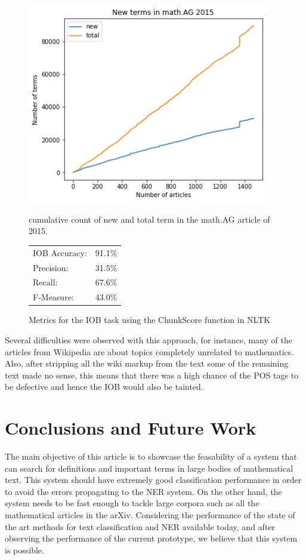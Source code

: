 \documentclass[a4paper]{easychair}
\begin{document}
\begin{figure}
    \centering
    \begin{minipage}{0.55\textwidth}
        \centering
    \includegraphics[width=0.95\textwidth]{cum_terms.png} 
        \caption{\label{cumterms}cumulative count of new and total term in the math.AG article of 2015.}
    \end{minipage}\hfill
    \begin{minipage}{0.4\textwidth}
        \centering
        {\small
        \begin{tabular}{lr}
    IOB Accuracy:  &91.1\%\\
    Precision:     &31.5\%\\
    Recall:        &67.6\%\\
    F-Measure:     &43.0\%
        \end{tabular}}
        \caption{\label{iobstats} Metrics for the IOB task using the ChunkScore function in NLTK}
    \end{minipage}
\end{figure}


Several difficulties were observed with this approach,  for instance, many of the articles from Wikipedia are about topics completely unrelated to mathematics. Also, after stripping all the wiki markup from the text some of the remaining text made no sense, this means that there was a high chance of the POS tags to be defective and hence the IOB would also be tainted. 
 
\section{Conclusions and Future Work}
The main objective of this article is to showcase the feasability of a system that can search for definitions and important terms in large bodies of mathematical text. This system should have extremely good classification performance in order to avoid the errors propagating to the NER system. On the other hand, the system needs to be fast enough to tackle large corpora such as all the mathematical articles in the arXiv. Considering the performance of the state of the art methods for text classification and NER available today, and after observing the performance of the current prototype, we believe that this system is possible.
\end{document}

